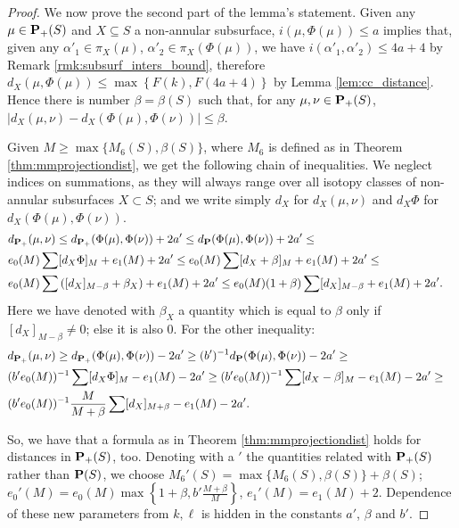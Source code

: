 \begin{proof}
We now prove the second part of the lemma's statement. %
Given any $\mu\in{\mathbf{P}_+}(S)$ and $X\subseteq S$ a non-annular subsurface, $i(\mu,\Phi(\mu))\leq a$ implies that, given any $\alpha'_1\in \pi_X(\mu)$, $\alpha'_2\in \pi_X(\Phi(\mu))$, we have $i(\alpha'_1,\alpha'_2)\leq 4a+4$ by Remark \ref{rmk:subsurf_inters_bound}, therefore $d_X\left(\mu,\Phi(\mu)\right)\leq \max \left\{F(k),F(4a+4)\right\}$ by Lemma \ref{lem:cc_distance}. Hence there is number $\beta=\beta(S)$ such that, for any $\mu,\nu\in{\mathbf{P}_+}(S)$, $|d_X(\mu,\nu)-d_X(\Phi(\mu),\Phi(\nu))|\leq \beta$.

Given $M\geq \max\{M_6(S),\beta(S)\}$, where $M_6$ is defined as in Theorem \ref{thm:mmprojectiondist}, we get the following chain of inequalities. We neglect indices on summations, as they will always range over all isotopy classes of non-annular subsurfaces $X\subset S$; and we write simply $d_X$ for $d_X(\mu,\nu)$ and $d_X\Phi$ for $d_X(\Phi(\mu),\Phi(\nu))$.
\begin{eqnarray*}
 & d_{\mathbf{P}_+}(\mu,\nu)\leq d_{\mathbf{P}_+}(\Phi(\mu),\Phi(\nu)) +2a' \leq d_\mathbf P(\Phi(\mu),\Phi(\nu)) +2a'\leq  & \\
 & e_0(M)\sum [d_X\Phi]_M + e_1(M)+2a' \leq e_0(M)\sum [d_X+\beta]_M + e_1(M)+2a' \leq  & \\
 & e_0(M)\sum \left([d_X]_{M-\beta}+\beta_X\right) + e_1(M)+2a' \leq e_0(M)(1+\beta)\sum [d_X]_{M-\beta} + e_1(M)+2a'. & 
\end{eqnarray*}
Here we have denoted with $\beta_X$ a quantity which is equal to $\beta$ only if $[d_X]_{M-\beta}\not=0$; else it is also $0$. For the other inequality:
\begin{eqnarray*}
 & d_{\mathbf{P}_+}(\mu,\nu) \geq d_{\mathbf{P}_+}(\Phi(\mu),\Phi(\nu)) -2a' \geq (b')^{-1} d_\mathbf P(\Phi(\mu),\Phi(\nu)) -2a' \geq  & \\
 & (b'e_0(M))^{-1}\sum [d_X\Phi]_M -e_1(M)-2a' \geq (b'e_0(M))^{-1}\sum [d_X-\beta]_M -e_1(M)-2a' \geq & \\
 & (b'e_0(M))^{-1} \frac{M}{M+\beta}\sum [d_X]_{M+\beta} -e_1(M)-2a'. & 
\end{eqnarray*}

So, we have that a formula as in Theorem \ref{thm:mmprojectiondist} holds for distances in ${\mathbf{P}_+}(S)$, too. Denoting with a $'$ the quantities related with ${\mathbf{P}_+}(S)$ rather than $\mathbf P(S)$, we choose $M_6'(S)=\max\{M_6(S),\beta(S)\}+\beta(S)$; $e_0'(M)=e_0(M)\max\left\{1+\beta,b'\frac{M+\beta}{M}\right\}$, $e_1'(M)=e_1(M)+2$. Dependence of these new parameters from $k,\ell$ is hidden in the constants $a'$, $\beta$ and $b'$.
\end{proof}

